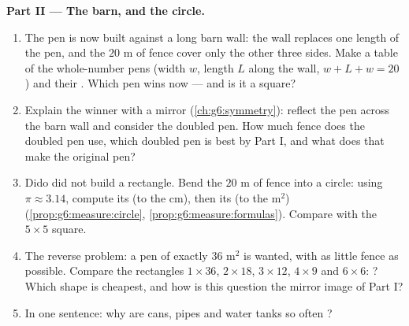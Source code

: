 \begin{problem}
\medskip
\noindent\textbf{Part II --- The barn, and the circle.}
\begin{enumerate}[resume]
  \item The pen is now built against a long barn wall: the wall
        replaces one length of the pen, and the $20$ m of fence
        cover only the other three sides. Make a table of the
        whole-number pens (width $w$, length $L$ along the wall,
        $w + L + w = 20$) and their . Which pen wins now ---
        and is it a square?
  \item Explain the winner with a mirror
        (\cref{ch:g6:symmetry}): reflect the pen across the barn
        wall and consider the doubled pen. How much fence does
        the doubled pen use, which doubled pen is best by Part I,
        and what does that make the original pen?
  \item Dido did not build a rectangle. Bend the $20$ m of fence
        into a circle: using $\pi \approx 3.14$, compute its
         (to the cm), then its  (to the m$^2$)
        (\cref{prop:g6:measure:circle},
        \cref{prop:g6:measure:formulas}). Compare with the
        $5 \times 5$ square.
  \item The reverse problem: a pen of  exactly $36$ m$^2$ is
        wanted, with as little fence as possible. Compare the
        rectangles $1 \times 36$, $2 \times 18$, $3 \times 12$,
        $4 \times 9$ and $6 \times 6$: ? Which shape is
        cheapest, and how is this question the mirror image of
        Part I?
  \item In one sentence: why are cans, pipes and water tanks so
        often \emph{}?
\end{enumerate}


\end{problem}
